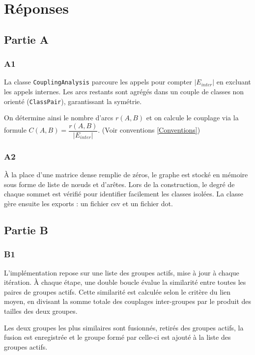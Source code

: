 \documentclass{Templates/customArticle}
\begin{document}
\section{Réponses}

\subsection{Partie A}

\subsubsection{A1}

La classe \texttt{CouplingAnalysis} parcoure les appels pour compter $|E_{inter}|$ en excluant les appels internes. Les arcs restants sont agrégés dans un couple de classes non orienté (\texttt{ClassPair}), garantissant la symétrie.

On détermine ainsi le nombre d'arcs $r(A,B)$ et on calcule le couplage via la formule $C(A, B) = \dfrac{r(A, B)}{|E_{inter}|}$. (Voir conventions \ref{Conventions})

\subsubsection{A2}

À la place d'une matrice dense remplie de zéros, le graphe est stocké en mémoire sous forme de liste de nœuds et d'arêtes. Lors de la construction, le degré de chaque sommet est vérifié pour identifier facilement les classes isolées. La classe gère ensuite les exports : un fichier csv et un fichier dot.
\newpage
\subsection{Partie B}

\subsubsection{B1}

L'implémentation repose sur une liste des groupes actifs, mise à jour à chaque itération. À chaque étape, une double boucle évalue la similarité entre toutes les paires de groupes actifs. Cette similarité est calculée selon le critère du lien moyen, en divisant la somme totale des couplages inter-groupes par le produit des tailles des deux groupes.

Les deux groupes les plus similaires sont fusionnés, retirés des groupes actifs, la fusion est enregistrée et le groupe formé par celle-ci est ajouté à la liste des groupes actifs.
\end{document}

